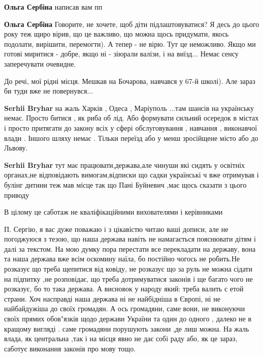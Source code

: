 \begin{itemize}
\begin{itemize} %
\textbf{Ольга Сербіна} написав вам пп

\textbf{Ольга Сербіна} Говорите, не хочете, щоб діти підлаштовуватися? Я десь до цього року теж щиро вірив, що це важливо, що можна щось придумати, якось подолати, вирішити, перемогти). А тепер - не вірю. Тут це неможливо. Якщо ми готові миритися - добре, якщо ні - зіюрали валізи, і на виїзд... Немає сенсу заперечувати очевидне.

До речі, мої рідні місця. Мешкав на Бочарова, навчався у 67-й школі). Але зараз би туди вже не повернувся...

\textbf{Serhii Bryhar} на жаль Харків , Одеса , Маріуполь ...там шансів на українську немає. Просто битися , як риба об лід. Або формувати сильний осередок в містах і просто притягати до закону всіх у сфері обслуговування , навчання , виконавчої влади . Іншого шляху немає . Тільки переїзд або у менш зросійщене місто або до Львову.

\textbf{Serhii Bryhar} тут має працювати,держава,але чинуши які сидять у освітніх органах,не відповідають вимогам,відписки що садки українські ч вже отримував і булінг дитини теж мав місце так що Пані Буйневич ,має щось сказати з цього приводу

В цілому це саботаж не кваліфікаційними вихователями і керівниками

\end{itemize} %


П. Сергію, я вас дуже поважаю і з цікавістю читаю ваші дописи, але не
погоджуюся з тезою, що наша держава навіть не намагається пояснювати дітям і
далі за текстом. На мою думку пора перестати все перекладати на державу, вона
та наша держава вже всім оскомину наїла, бо постійно чогось не робить.Не
розказує що треба щепитися від ковіду, не розказує що за руль не можна сідати
на підпитку ,не розповідає, що треба дотримуватися законів і ще багато чого не
розказує, бо то така держава. А висновок у народу який: треба валить с етой
страни. Хоч насправді наша держава ні не найбідніша в Європі, ні не
найбайдужіша до своїх громадян. А ось громадяни, саме вони, не виконуючи своїх
прямих обов"язків щодо держави України та один до одного , далеко не в кращому
вигляді . саме громадяни порушують закони ,де лиш можна. На жаль влада, як
центральна ,так і на місця явно не дає собі раду або, як це зараз, саботує
виконання законів про мову тощо.  


\end{itemize}
